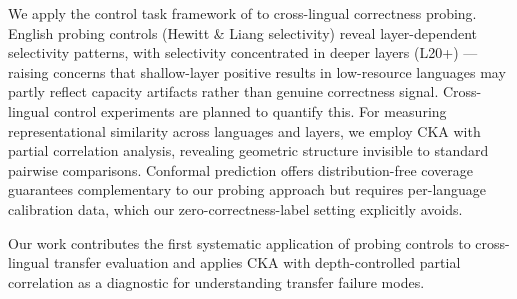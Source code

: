 We apply the control task framework of \citet{hewitt2019control} to cross-lingual correctness probing. English probing controls (Hewitt \& Liang selectivity) reveal layer-dependent selectivity patterns, with selectivity concentrated in deeper layers (L20+) --- raising concerns that shallow-layer positive results in low-resource languages may partly reflect capacity artifacts rather than genuine correctness signal. Cross-lingual control experiments are planned to quantify this. For measuring representational similarity across languages and layers, we employ CKA \cite{kornblith2019cka} with partial correlation analysis, revealing geometric structure invisible to standard pairwise comparisons. Conformal prediction \cite{angelopoulos2023conformal} offers distribution-free coverage guarantees complementary to our probing approach but requires per-language calibration data, which our zero-correctness-label setting explicitly avoids.

Our work contributes the first systematic application of probing controls to cross-lingual transfer evaluation and applies CKA with depth-controlled partial correlation as a diagnostic for understanding transfer failure modes.

